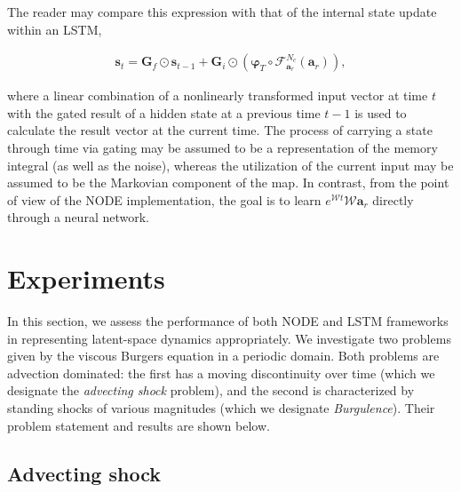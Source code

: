 \documentclass[preprint,12pt]{elsarticle}
\begin{document}
The reader may compare this expression with that of the internal state update within an LSTM, 
\begin{linenomath*}
\begin{align}
\boldsymbol{s}_{t}=\boldsymbol{G}_{f} \odot \boldsymbol{s}_{t-1}+\boldsymbol{G}_{i} \odot\left(\boldsymbol{\varphi}_{T} \circ \mathcal{F}_{\mathbf{a}_r}^{N_{c}}(\mathbf{a}_r)\right),
\end{align}
\end{linenomath*}
where a linear combination of a nonlinearly transformed input vector at time $t$ with the gated result of a hidden state at a previous time $t-1$ is used to calculate the result vector at the current time. The process of carrying a state through time via gating may be assumed to be a representation of the memory integral (as well as the noise), whereas the utilization of the current input may be assumed to be the Markovian component of the map. In contrast, from the point of view of the NODE implementation, the goal is to learn $e^{\mathcal{W} t} \mathcal{W} \mathbf{a}_{r}$ directly through a neural network. 

\section{Experiments}

In this section, we assess the performance of both NODE and LSTM frameworks in representing latent-space dynamics appropriately. We investigate two problems given by the viscous Burgers equation in a periodic domain. Both problems are advection dominated:  the first has a moving discontinuity over time (which we  designate the \emph{advecting shock} problem), and the second is characterized by standing shocks of various magnitudes (which we designate \emph{Burgulence}). Their problem statement and results are shown below.

\subsection{Advecting shock}
\end{document}
